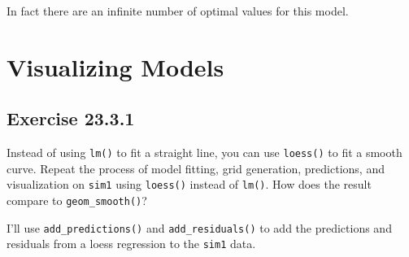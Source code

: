 \documentclass[]{book}
\newenvironment{Shaded}{\begin{snugshade}}{\end{snugshade}}
\newcommand{\CommentTok}[1]{\textcolor[rgb]{0.56,0.35,0.01}{\textit{#1}}}
\newcommand{\DataTypeTok}[1]{\textcolor[rgb]{0.13,0.29,0.53}{#1}}
\newcommand{\DecValTok}[1]{\textcolor[rgb]{0.00,0.00,0.81}{#1}}
\newcommand{\KeywordTok}[1]{\textcolor[rgb]{0.13,0.29,0.53}{\textbf{#1}}}
\newcommand{\NormalTok}[1]{#1}
\newcommand{\OperatorTok}[1]{\textcolor[rgb]{0.81,0.36,0.00}{\textbf{#1}}}
\newcommand{\StringTok}[1]{\textcolor[rgb]{0.31,0.60,0.02}{#1}}
\theoremstyle{plain}
\theoremstyle{remark}
\theoremstyle{definition}
\theoremstyle{definition}
\theoremstyle{definition}
\theoremstyle{remark}
\begin{document}
\begin{Shaded}
\end{Shaded}

\begin{Shaded}
\end{Shaded}

In fact there are an infinite number of optimal values for this model.

\hypertarget{visualizing-models}{%
\section{Visualizing Models}\label{visualizing-models}}

\hypertarget{exercise-23.3.1}{%
\subsection*{\texorpdfstring{Exercise
{23.3.1}}{Exercise 23.3.1}}\label{exercise-23.3.1}}

Instead of using \texttt{lm()} to fit a straight line, you can use
\texttt{loess()} to fit a smooth curve. Repeat the process of model
fitting, grid generation, predictions, and visualization on
\texttt{sim1} using \texttt{loess()} instead of \texttt{lm()}. How does
the result compare to \texttt{geom\_smooth()}?

I'll use \texttt{add\_predictions()} and \texttt{add\_residuals()} to
add the predictions and residuals from a loess regression to the
\texttt{sim1} data.
\end{document}
